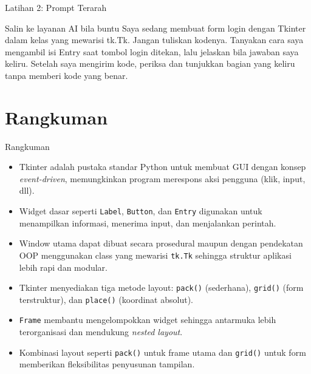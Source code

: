 \documentclass[aspectratio=169, table]{beamer}
\begin{document}
\begin{frame}{Latihan 2: Prompt Terarah}
\begin{block}{Salin ke layanan AI bila buntu}
\small Saya sedang membuat form login dengan Tkinter dalam kelas yang mewarisi tk.Tk. Jangan tuliskan kodenya. Tanyakan cara saya mengambil isi Entry saat tombol login ditekan, lalu jelaskan bila jawaban saya keliru. Setelah saya mengirim kode, periksa dan tunjukkan bagian yang keliru tanpa memberi kode yang benar.
\end{block}
\end{frame}

\section{Rangkuman}
\begin{frame}[fragile]{Rangkuman}
\vspace{20pt}

\begin{itemize}
    \item Tkinter adalah pustaka standar Python untuk membuat GUI dengan konsep \textit{event-driven}, memungkinkan program merespons aksi pengguna (klik, input, dll).
    \item Widget dasar seperti \texttt{Label}, \texttt{Button}, dan \texttt{Entry} digunakan untuk menampilkan informasi, menerima input, dan menjalankan perintah.
    \item Window utama dapat dibuat secara prosedural maupun dengan pendekatan OOP menggunakan class yang mewarisi \texttt{tk.Tk} sehingga struktur aplikasi lebih rapi dan modular.

    \item Tkinter menyediakan tiga metode layout:  
          \texttt{pack()} (sederhana), \texttt{grid()} (form terstruktur), dan \texttt{place()} (koordinat absolut).
    \item \texttt{Frame} membantu mengelompokkan widget sehingga antarmuka lebih terorganisasi dan mendukung \textit{nested layout}.
    \item Kombinasi layout seperti \texttt{pack()} untuk frame utama dan \texttt{grid()} untuk form memberikan fleksibilitas penyusunan tampilan.
\end{itemize}

\end{frame}
\end{document}
